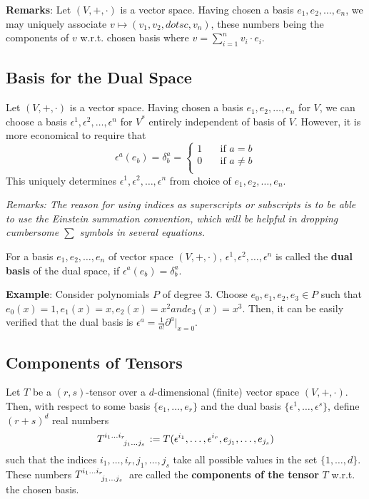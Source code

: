 \textbf{Remarks}: Let $(V,+,\cdot)$ is a vector space. Having chosen a basis $e_1,e_2,\dotsc,e_n$, we may uniquely associate $v \mapsto (v_1,v_2,dotsc,v_n)$, these numbers being the components of $v$ w.r.t. chosen basis where $v = \displaystyle\sum_{i=1}^n v_i \cdot e_i$.

\subsection{Basis for the Dual Space}
Let $(V,+,\cdot)$ is a vector space. Having chosen a basis $e_1,e_2,\dotsc,e_n$ for $V$, we can choose a basis $\epsilon^1,\epsilon^2,\dotsc,\epsilon^n$ for $V^\ast$ entirely independent of basis of $V$. However, it is more economical to require that
\begin{equation*}
\epsilon^a (e_b) = \delta_b^a = \begin{cases}
1 &\quad \text{if } a = b \\
0 &\quad \text{if } a \neq b \\
\end{cases}
\end{equation*} This uniquely determines $\epsilon^1,\epsilon^2,\dotsc,\epsilon^n$ from choice of $e_1,e_2,\dotsc,e_n$.

\textit{Remarks: The reason for using indices as superscripts or subscripts is to be able to use the Einstein summation convention, which will be helpful in dropping cumbersome $\sum$ symbols in several equations.}

\begin{definition}
For a basis $e_1,e_2,\dotsc,e_n$ of vector space $(V,+,\cdot)$, $\epsilon^1,\epsilon^2,\dotsc,\epsilon^n$ is called the \textbf{dual basis} of the dual space, if $\epsilon^a (e_b) = \delta_b^a$.
\end{definition}

\textbf{Example}: Consider polynomials $P$ of degree 3. Choose $e_0,e_1,e_2,e_3 \in P$ such that $e_0(x) = 1, e_1(x) = x, e_2(x) = x^2 and e_3(x) = x^3$. Then, it can be easily verified that the dual basis is $\epsilon^a = \displaystyle\frac{1}{a!}\partial^a\Big|_{x=0}$.

\subsection{Components of Tensors}
\label{ss:L3_TensorComponents}
\begin{definition}
Let $T$ be a $(r,s)$-tensor over a $d$-dimensional (finite) vector space $(V,+,\cdot)$. Then, with respect to some basis $\lbrace e_1, \dotsc, e_r \rbrace$ and the dual basis $\lbrace \epsilon^1, \dotsc, \epsilon^s \rbrace$, define $(r+s)^d$ real numbers
\begin{equation*}
T\indices{^{i_1 \dots i_r}_{j_1 \dots j_s}} := T(\epsilon^{i_1}, \dotsc, \epsilon^{i_r}, e_{j_1}, \dotsc, e_{j_s})
\end{equation*} such that the indices $i_1, \dotsc, i_r, j_1, \dotsc, j_s$ take all possible values in the set $\lbrace 1,\dotsc,d \rbrace$. These numbers $T\indices{^{i_1 \dots i_r}_{j_1 \dots j_s}}$ are called the \textbf{components of the tensor} $T$ w.r.t. the chosen basis.
\end{definition}

